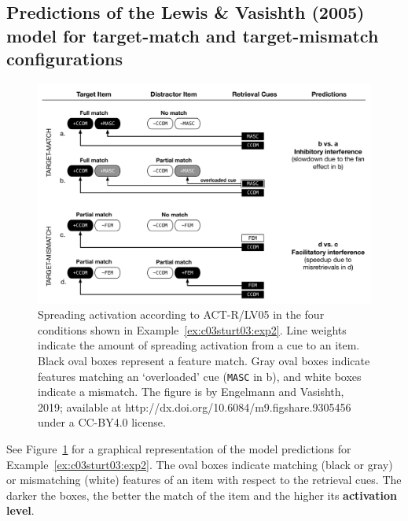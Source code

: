 \documentclass{cambridge7A}\usepackage[]{graphicx}\usepackage[]{color}
\newcommand{\actrcue}[1]{\texttt{\uppercase{#1}}}
\begin{document}
\subsection{Predictions of the Lewis \& Vasishth (2005) model for target-match and target-mismatch configurations} \label{core03predictions}

\begin{figure}[!htbp]
\includegraphics[width=\textwidth]{figures/tableLV05pred}
    \caption{Spreading activation according to ACT-R/LV05 in the four conditions shown in Example~\ref{ex:c03sturt03:exp2}. Line weights indicate the amount of  spreading activation from a cue to an item. Black oval boxes represent a feature match. Gray oval boxes indicate features matching an  `overloaded' cue (\actrcue{MASC} in b), and white boxes indicate a mismatch. The figure is by Engelmann and Vasishth, 2019; available at http://dx.doi.org/10.6084/m9.figshare.9305456 under a CC-BY4.0 license.}\label{fig:c03ACTRpred}
\end{figure}


See Figure~\ref{fig:c03ACTRpred} for a graphical representation of the model predictions for Example~\ref{ex:c03sturt03:exp2}. The oval boxes indicate matching (black or gray) or mismatching (white) features of an item with respect to the retrieval cues. The darker the boxes, the better the match of the item and the higher its  \textbf{activation level}.
\end{document}

